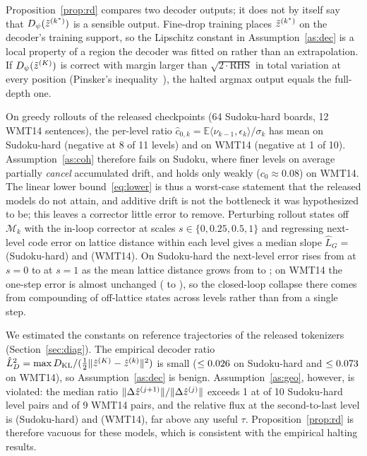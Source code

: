 \begin{remark}
Proposition~\ref{prop:rd} compares two decoder outputs; it does not by itself say that $D_\psi(\tilde{z}^{(k^\ast)})$ is a sensible output. Fine-drop training places $\tilde{z}^{(k^\ast)}$ on the decoder's training support, so the Lipschitz constant in Assumption~\ref{as:dec} is a local property of a region the decoder was fitted on rather than an extrapolation. If $D_\psi(\tilde{z}^{(K)})$ is correct with margin larger than $\sqrt{2\cdot\mathrm{RHS}}$ in total variation at every position (Pinsker's inequality~\citep{pinsker1964,cover2006elements}), the halted argmax output equals the full-depth one.
\end{remark}


\begin{remark}\label{rem:c0}
On greedy rollouts of the released checkpoints (64 Sudoku-hard boards, 12 WMT14 sentences), the per-level ratio $\hat c_{0,k}=\mathbb{E}\langle \nu_{k-1},\epsilon_k\rangle/\sigma_k$ has mean \CzeroSud{} on Sudoku-hard (negative at 8 of 11 levels) and \CzeroWmt{} on WMT14 (negative at 1 of 10). Assumption~\ref{as:coh} therefore fails on Sudoku, where finer levels on average partially \emph{cancel} accumulated drift, and holds only weakly ($c_0\approx0.08$) on WMT14. The linear lower bound~\eqref{eq:lower} is thus a worst-case statement that the released models do not attain, and additive drift is not the bottleneck it was hypothesized to be; this leaves a corrector little error to remove. Perturbing rollout states off $\mathcal{M}_k$ with the in-loop corrector at scales $s\in\{0,0.25,0.5,1\}$ and regressing next-level code error on lattice distance within each level gives a median slope $\hat L_G=$ \LGSud{} (Sudoku-hard) and \LGWmt{} (WMT14). On Sudoku-hard the next-level error rises from \SigOnSud{} at $s=0$ to \SigOneSud{} at $s=1$ as the mean lattice distance grows from \DistZeroSud{} to \DistOneSud; on WMT14 the one-step error is almost unchanged (\SigOnWmt{} to \SigOneWmt), so the closed-loop collapse there comes from compounding of off-lattice states across levels rather than from a single step.
\end{remark}

\begin{remark}
We estimated the constants on reference trajectories of the released tokenizers (Section~\ref{sec:diag}). The empirical decoder ratio $\hat L_D^2=\max D_{\mathrm{KL}}/(\frac12\|\hat{z}^{(K)}-\hat{z}^{(k)}\|^2)$ is small ($\le0.026$ on Sudoku-hard and $\le0.073$ on WMT14), so Assumption~\ref{as:dec} is benign. Assumption~\ref{as:geo}, however, is violated: the median ratio $\|\Delta\hat{z}^{(j+1)}\|/\|\Delta\hat{z}^{(j)}\|$ exceeds 1 at \RhoGtOneSud{} of 10 Sudoku-hard level pairs and \RhoGtOneWmt{} of 9 WMT14 pairs, and the relative flux at the second-to-last level is \FluxLastSud{} (Sudoku-hard) and \FluxLastWmt{} (WMT14), far above any useful $\tau$. Proposition~\ref{prop:rd} is therefore vacuous for these models, which is consistent with the empirical halting results.
\end{remark}
